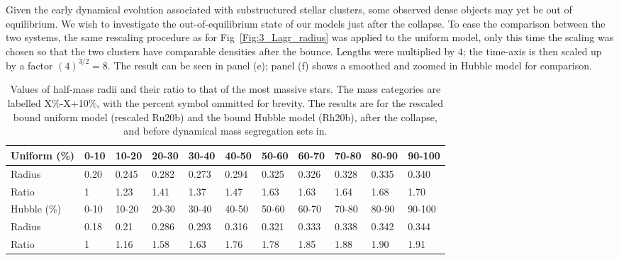 Given the early dynamical evolution associated with substructured stellar clusters, some observed dense objects may yet be out of equilibrium. We wish to investigate the out-of-equilibrium state of our models just after the collapse. To ease the comparison between the two systems, the same rescaling procedure as for Fig~\ref{Fig:3_Lagr_radius} was applied to the uniform model, only this time the scaling was chosen so that the two clusters have comparable densities after the bounce. Lengths were multiplied by $4$; the time-axis is then scaled up by a factor $(4)^{3/2} = 8$. The result can be seen in panel (e); panel (f) shows a smoothed and zoomed in Hubble model for comparison.



\begin{table}
\caption{Values of half-mass radii and their ratio to that of the most massive stars. The mass categories are labelled X\%-X+10\%, with the percent symbol ommitted for brevity. The results are for the rescaled bound uniform model (rescaled Ru20b) and the bound Hubble model (Rh20b), after the collapse, and before dynamical mass segregation sets in.} \label{Tab:RhmVal}
\begin{center}
\begin{tabular}{l|llllllllll}
Uniform (\%) & 0-10 & 10-20 & 20-30 & 30-40 & 40-50 & 50-60 & 60-70 & 70-80 & 80-90 & 90-100 \\
\hline
Radius   & 0.20 & 0.245 & 0.282 & 0.273 & 0.294 & 0.325 & 0.326 &  0.328 & 0.335 & 0.340 \\
Ratio    & 1 & 1.23 & 1.41 & 1.37 & 1.47  & 1.63 & 1.63 &  1.64 & 1.68 & 1.70 \\

\hline
Hubble (\%) & 0-10 & 10-20 & 20-30 & 30-40 & 40-50 & 50-60 & 60-70 & 70-80 & 80-90 & 90-100 \\
\hline
Radius  &  0.18 & 0.21 & 0.286 & 0.293 & 0.316 & 0.321 & 0.333 & 0.338 & 0.342 & 0.344 \\
 Ratio       & 1 & 1.16 & 1.58 & 1.63 & 1.76  & 1.78  & 1.85 &  1.88 & 1.90 &  1.91 \\
\end{tabular}
\end{center}
\end{table}


%


